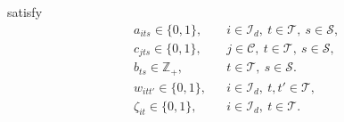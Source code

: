 \documentclass[pdflatex,sn-mathphys-num]{sn-jnl}%
\theoremstyle{thmstyleone}%
\theoremstyle{thmstyletwo}%
\theoremstyle{thmstylethree}%
\newcommand{\danique}[1]{\textcolor{magenta}{#1}}
\newcommand{\set}[1]{\mathcal{#1}}
\begin{document}
satisfy 
\begin{align}
& a_{its}\in\{0,1\},
&& i\in\mathcal I_d,\ t\in\mathcal T,\ s\in\mathcal S,
\label{eq:routing_binary_a}\\
& c_{jts}\in\{0,1\},
&& j\in\mathcal C,\ t\in\mathcal T,\ s\in\mathcal S,
\label{eq:routing_binary_c}\\
& b_{ts}\in\mathbb Z_+,
&& t\in\mathcal T,\ s\in\mathcal S.
\label{eq:routing_integer_b}\\
& w_{itt'} \in \{0,1\}, && i \in \set I_d, \ t, t' \in \set T, \\
& \zeta_{it} \in \{0,1\}, && i \in \set I_d, \ t \in \set T.
\label{eq:routing_w_dom_vec}
\end{align}




\end{document}
